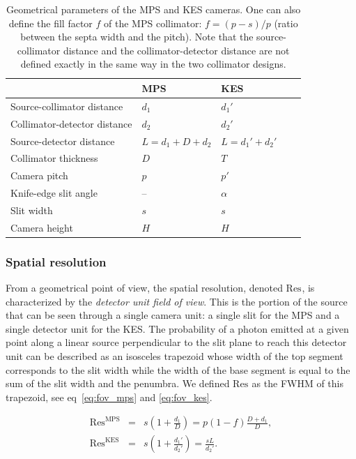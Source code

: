 \documentclass[a4paper,english,12pt]{article}
\newcommand\FOV{\textrm{Res}}
\newcommand\MPS{\textrm{MPS}}
\newcommand\KES{\textrm{KES}}
\newcommand\du{}
\begin{document}
\begin{table}[h]
\centering
\begin{tabular}{lllll}
	\midrule
																& MPS               & KES \\
	\midrule
	Source-collimator distance		& $d_1$             & $d_1'$ \\
 	Collimator-detector distance	& $d_2$             & $d_2'$ \\
	Source-detector distance			& $L=d_1+D+d_2$			& $L=d_1'+d_2'$\\
 	Collimator thickness 					& $D$               & $T$ \\
	Camera pitch									& $p$								& $p'$\\
	Knife-edge slit angle					& --								& $\alpha$\\
	Slit width										& $s$ 							& $s$ \\ %
	Camera height									& $H$ 							& $H$ \\
	\midrule
\end{tabular}
\caption{Geometrical parameters of the MPS and KES cameras. One can also define the fill factor $f$ of the MPS collimator: $f=(p-s)/p$ (ratio between the septa width and the pitch). Note that the source-collimator distance and the collimator-detector distance are not defined exactly in the same way in the two collimator designs.}
\label{table:CamerasParameters}
\end{table}

\subsubsection{Spatial resolution}

From a geometrical point of view, the spatial resolution, denoted $\FOV_{\du}$, is characterized by the \textit{detector unit field of view}. This is the portion of
the source that can be seen through a single camera unit: a single slit for the MPS and a single detector unit for the KES. The probability of a photon emitted at a
given point along a linear source perpendicular to the slit plane to reach
this detector unit can be described as an isosceles trapezoid whose width of the top segment corresponds to the slit width while the width of the base segment is equal to the sum of the slit width and the penumbra. We defined $\FOV_{\du}$
as the FWHM of this trapezoid, see eq~\ref{eq:fov_mps} and \ref{eq:fov_kes}.

\begin{eqnarray}
  \label{eq:fov_mps}
  \FOV_{\du}^{\MPS} & = & s\left(1+ \frac{d_1}{D}\right) = p(1-f) \frac{D+d_1}{D}, \\
  \label{eq:fov_kes}
   \FOV_{\du}^{\KES} & = & s\left(1+ \frac{d_1'}{d_2'}\right) = \frac{sL}{d_2'}.
\end{eqnarray}
\end{document}
